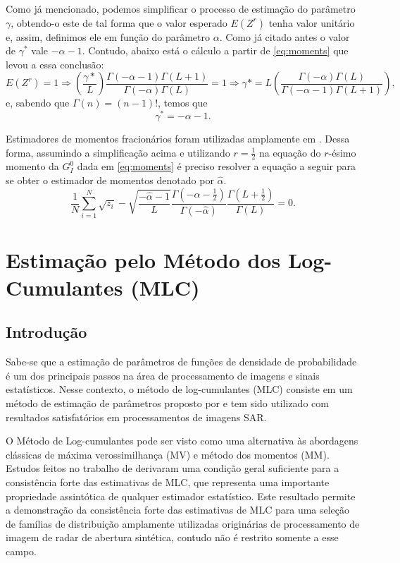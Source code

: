 Como já mencionado, podemos simplificar o processo de estimação do parâmetro $\gamma$, obtendo-o este de tal forma que o valor esperado $E(Z^r)$ tenha valor unitário e, assim, definimos ele em função do parâmetro $\alpha$. Como já citado antes o valor de $\gamma^{*}$ vale $-\alpha - 1$. Contudo, abaixo está o cálculo a partir de \eqref{eq:moments} que levou a essa conclusão:
\begin{equation}
    E(Z^r) = 1 \Rightarrow \left (\frac{\gamma*}{L}\right ) \frac{\Gamma(-\alpha-1)\Gamma(L+1)}{\Gamma(-\alpha)\Gamma(L)} = 1 \Rightarrow \gamma* = L\left ( \frac{\Gamma(-\alpha)\Gamma(L)}{\Gamma(-\alpha-1)\Gamma(L+1)} \right ) ,
\end{equation}
e, sabendo que $\Gamma(n) = (n-1)!$, temos que
\begin{equation}
    \gamma^{*} = -\alpha - 1.
\end{equation}

Estimadores de momentos fracionários foram utilizadas amplamente em \citet{Clutter1997}. Dessa forma, assumindo a simplificação acima e utilizando $r=\frac{1}{2}$ na equação do $r$-ésimo momento da $G_I^0$ dada em \eqref{eq:moments} é preciso resolver a equação a seguir para se obter o estimador de momentos denotado por $\widehat{\alpha}$.
\begin{equation}
    \frac{1}{N}\sum_{i=1}^{N}\sqrt{z_i}-\sqrt{\frac{-\widehat{\alpha} - 1}{L}}\frac{\Gamma(-\widehat{\alpha} - \frac{1}{2})}{\Gamma(-\widehat{\alpha})}\frac{\Gamma(L+\frac{1}{2})}{\Gamma(L)} = 0 .\label{fractional_moments}
\end{equation} 

\section{Estimação pelo Método dos Log-Cumulantes (MLC)}

\subsection{Introdução}

Sabe-se que a estimação de parâmetros de funções de densidade de probabilidade é um dos principais passos na área de processamento de imagens e sinais estatísticos. Nesse contexto, o método de log-cumulantes (MLC) consiste em um método de estimação de parâmetros proposto por \citet{nicolas2002} e tem sido utilizado com resultados satisfatórios em processamentos de imagens SAR.

O Método de Log-cumulantes pode ser visto como uma alternativa às abordagens clássicas de máxima verossimilhança (MV) e método dos momentos (MM). 
Estudos feitos no trabalho de \citet{krylov2013} derivaram uma condição geral suficiente para a consistência forte das estimativas de MLC, que representa uma importante propriedade assintótica de qualquer estimador estatístico. 
Este resultado permite a demonstração da consistência forte das estimativas de MLC para uma seleção de famílias de distribuição amplamente utilizadas originárias de processamento de imagem de radar de abertura sintética, contudo não é restrito somente a esse campo. 

